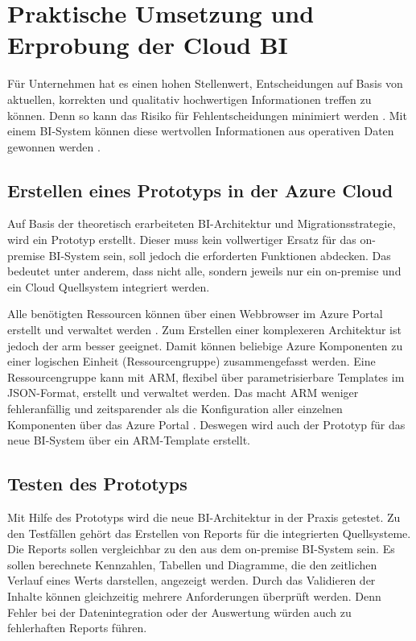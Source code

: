 \chapter{Praktische Umsetzung und Erprobung der Cloud BI}
\label{ch:praktischeUmsetzung}
Für Unternehmen hat es einen hohen Stellenwert, Entscheidungen auf Basis von aktuellen, korrekten und qualitativ hochwertigen Informationen treffen zu können. Denn so kann das Risiko für Fehlentscheidungen minimiert werden \cite{grunwald_business_2009}. Mit einem BI-System können diese wertvollen Informationen aus operativen Daten gewonnen werden \cite{muller_business_2013}.

\section{Erstellen eines Prototyps in der Azure Cloud}
\label{sec:intro:erstellenDesPrototyps}
Auf Basis der theoretisch erarbeiteten BI-Architektur und Migrationsstrategie, wird ein Prototyp erstellt. Dieser muss kein vollwertiger Ersatz für das on-premise BI-System sein, soll jedoch die erforderten Funktionen abdecken. Das bedeutet unter anderem, dass nicht alle, sondern jeweils nur ein on-premise und ein Cloud Quellsystem integriert werden.

Alle benötigten Ressourcen können über einen Webbrowser im Azure Portal erstellt und verwaltet werden \cite{chilberto_building_2020}. Zum Erstellen einer komplexeren Architektur ist jedoch der \ac{arm} besser geeignet. Damit können beliebige Azure Komponenten zu einer logischen Einheit (Ressourcengruppe) zusammengefasst werden. Eine Ressourcengruppe kann mit ARM, flexibel über parametrisierbare Templates im JSON-Format, erstellt und verwaltet werden. Das macht ARM weniger fehleranfällig und zeitsparender als die Konfiguration aller einzelnen Komponenten über das Azure Portal \cite{monadjemi_azure-administration_2017}. Deswegen wird auch der Prototyp für das neue BI-System über ein ARM-Template erstellt.

\section{Testen des Prototyps}
\label{sec:intro:testenDesPrototyps}
Mit Hilfe des Prototyps wird die neue BI-Architektur in der Praxis getestet. Zu den Testfällen gehört das Erstellen von Reports für die integrierten Quellsysteme. Die Reports sollen vergleichbar zu den aus dem on-premise BI-System sein. Es sollen berechnete Kennzahlen, Tabellen und Diagramme, die den zeitlichen Verlauf eines Werts darstellen, angezeigt werden. Durch das Validieren der Inhalte können gleichzeitig mehrere Anforderungen überprüft werden. Denn Fehler bei der Datenintegration oder der Auswertung würden auch zu fehlerhaften Reports führen.